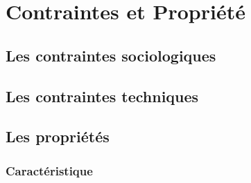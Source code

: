 \chapter{Contraintes et Propriété}

\section{Les contraintes sociologiques}


\section{Les contraintes techniques}

\section{Les propriétés}

\subsection{Caractéristique}
